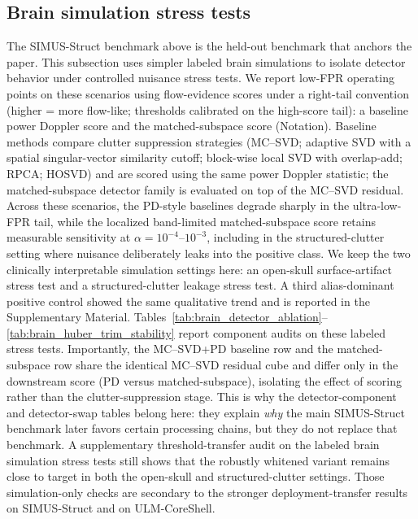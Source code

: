 \documentclass[11pt]{article}
\begin{document}
\subsection{Brain simulation stress tests}
The SIMUS-Struct benchmark above is the held-out benchmark that anchors the paper. This subsection uses simpler labeled brain simulations to isolate detector behavior under controlled nuisance stress tests. We report low-FPR operating points on these scenarios using flow-evidence scores under a right-tail convention (higher = more flow-like; thresholds calibrated on the high-score tail): a baseline power Doppler score and the matched-subspace score (Notation). Baseline methods compare clutter suppression strategies (MC--SVD; adaptive SVD with a spatial singular-vector similarity cutoff; block-wise local SVD with overlap-add; RPCA; HOSVD) and are scored using the same power Doppler statistic; the matched-subspace detector family is evaluated on top of the MC--SVD residual. Across these scenarios, the PD-style baselines degrade sharply in the ultra-low-FPR tail, while the localized band-limited matched-subspace score retains measurable sensitivity at $\alpha=10^{-4}$--$10^{-3}$, including in the structured-clutter setting where nuisance deliberately leaks into the positive class. We keep the two clinically interpretable simulation settings here: an open-skull surface-artifact stress test and a structured-clutter leakage stress test. A third alias-dominant positive control showed the same qualitative trend and is reported in the Supplementary Material. Tables~\ref{tab:brain_detector_ablation}--\ref{tab:brain_huber_trim_stability} report component audits on these labeled stress tests.
\noindent Importantly, the MC--SVD+PD baseline row and the matched-subspace row share the identical MC--SVD residual cube and differ only in the downstream score (PD versus matched-subspace), isolating the effect of scoring rather than the clutter-suppression stage. This is why the detector-component and detector-swap tables belong here: they explain \emph{why} the main SIMUS-Struct benchmark later favors certain processing chains, but they do not replace that benchmark.
\noindent A supplementary threshold-transfer audit on the labeled brain simulation stress tests still shows that the robustly whitened variant remains close to target in both the open-skull and structured-clutter settings. Those simulation-only checks are secondary to the stronger deployment-transfer results on SIMUS-Struct and on ULM-CoreShell.
\end{document}
